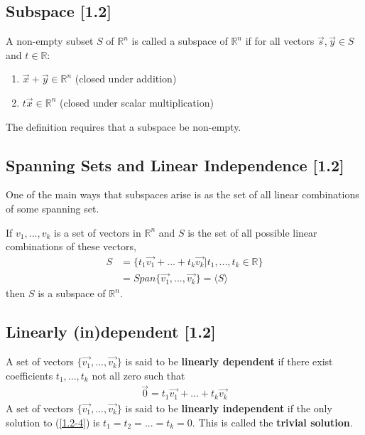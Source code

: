 \documentclass[a4paper,9pt]{extarticle}
\begin{document}
\begin{multicols*}{2}

\subsection{Subspace [1.2]}
A non-empty subset $S$ of $\mathbb{R}^n$ is called a subspace of $\mathbb{R}^n$ if for all vectors $\vec{s},\vec{y} \in S$ and $t \in \mathbb{R}$:
\begin{enumerate}[label=\bfseries (\arabic*)] \itemsep0pt \parskip0pt 
  \item $\vec{x} + \vec{y} \in \mathbb{R}^n$ (closed under addition)
  \item $t \vec{x} \in \mathbb{R}^n$ (closed under scalar multiplication)
\end{enumerate}
The definition requires that a subspace be non-empty.


\subsection{Spanning Sets and Linear Independence [1.2]}
One of the main ways that subspaces arise is as the set of all linear combinations of some spanning set.

If ${v_1, ..., v_k}$ is a set of vectors in $\mathbb{R}^n$ and $S$ is the set of all possible linear combinations of these vectors,
\begin{equation} \label{1.2-3}
    \begin{split}
        S & = \{t_1 \vec{v_1} + ... + t_k \vec{v_k} | t_1, ..., t_k \in \mathbb{R}\} \\ & = Span\{\vec{v_1}, ..., \vec{v_k}\} = \langle S \rangle
    \end{split}
\end{equation}
then $S$ is a subspace of $\mathbb{R}^n$.


\subsection{Linearly (in)dependent [1.2]}
A set of vectors $\{\vec{v_1}, ..., \vec{v_k}\}$ is said to be \textbf{linearly dependent} if there exist coefficients $t_1, ..., t_k$ not all zero such that
\begin{equation} \label{1.2-4}
    \begin{split}
        \vec{0} = t_1 \vec{v_1} + ... + t_k \vec{v_k}
    \end{split}
\end{equation}
A set of vectors $\{\vec{v_1}, ..., \vec{v_k}\}$ is said to be \textbf{linearly independent} if the only solution to (\ref{1.2-4}) is $t_1 = t_2 = ... = t_k = 0$. This is called the \textbf{trivial solution}.


\end{multicols*}
\end{document}
